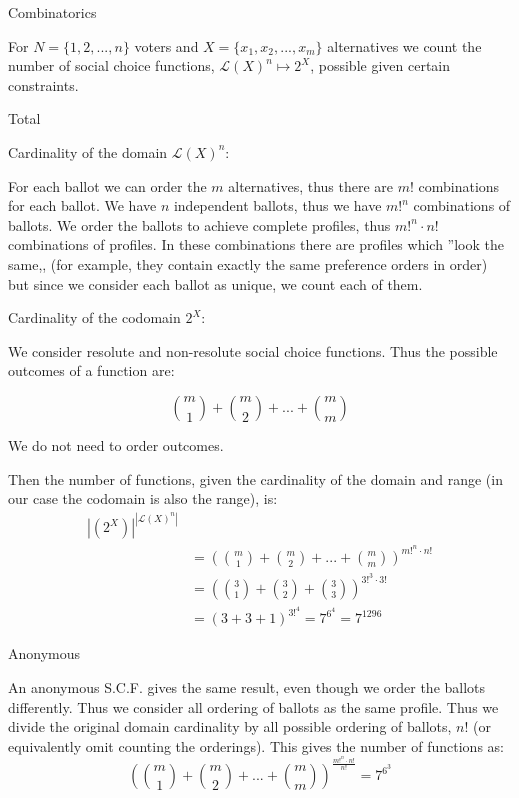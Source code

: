 \documentclass[12pt]{article}
\newenvironment{question}[2][Question]{\begin{trivlist}
\item[\hskip \labelsep {\bfseries #1}\hskip \labelsep {\bfseries #2.}]}{\end{trivlist}}
\newenvironment{answer}[2][Answer]{\begin{trivlist}
\item[\hskip \labelsep {\bfseries #1}\hskip \labelsep {\bfseries #2:}]}{\end{trivlist}}
\begin{document}
\begin{question}{3}{Combinatorics}

For $N=\{1,2, ..., n\}$ voters and $X=\{x_1, x_2, ..., x_m\}$ alternatives we count the number of social choice functions, $\mathcal{L}(X)^n \mapsto 2^X$, possible given certain constraints.
\end{question}
\begin{answer}{a)}{Total}

Cardinality of the domain $\mathcal{L}(X)^n$:

For each ballot we can order the $m$ alternatives, thus there are $m!$ combinations for each ballot.
We have $n$ independent ballots, thus we have $m!^n$ combinations of ballots.
We order the ballots to achieve complete profiles, thus $m!^n \cdot n!$ combinations of profiles. In these combinations there are profiles which ''look the same,, (for example, they contain exactly the same preference orders in order) but since we consider each ballot as unique, we count each of them.

Cardinality of the codomain $2^X$:

We consider resolute and non-resolute social choice functions. Thus the possible outcomes of a function are:

$$\binom{m}{1} + \binom{m}{2} + ... + \binom{m}{m}$$

We do not need to order outcomes.

Then the number of functions, given the cardinality of the domain and range (in our case the codomain is also the range), is:
\begin{align*}
|(2^X)|^{|\mathcal{L}(X)^n|}& \\
&=(\binom{m}{1} + \binom{m}{2} + ... + \binom{m}{m})^{m!^n \cdot n!} \\
&=(\binom{3}{1} + \binom{3}{2} + \binom{3}{3})^{3!^3 \cdot 3!} \\
&=(3 + 3 + 1)^{3!^4}= 7^{6^4}=7^1296
\end{align*}


\end{answer}
\begin{answer}{b)}{Anonymous}

An anonymous S.C.F. gives the same result, even though we order the ballots differently. Thus we consider all ordering of ballots as the same profile. Thus we divide the original domain cardinality by all possible ordering of ballots, $n!$ (or equivalently omit counting the orderings). This gives the number of functions as:
$$(\binom{m}{1} + \binom{m}{2} + ... + \binom{m}{m})^{\frac{m!^n \cdot n!}{n!}}=7^{6^3}$$
\end{answer}
\end{document}
